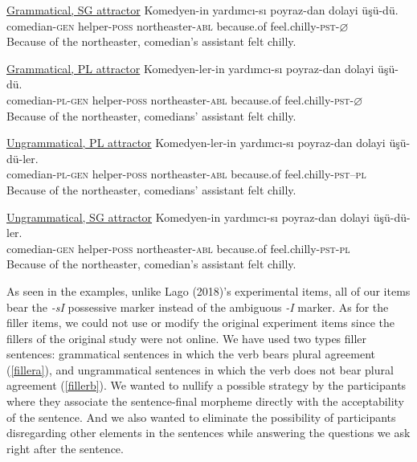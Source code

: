 \documentclass[11pt,a4paper]{article}
\begin{document}
\begin{exe}
\ex
\begin{xlist}
\ex \underline{Grammatical, SG attractor} \label{exp1}
\gll Komedyen-in yard{\i}mc{\i}-s{\i} poyraz-dan dolayi \"{u}\c{s}\"{u}-d\"{u}.\\
comedian-\textsc{gen} helper-\textsc{poss} northeaster-\textsc{abl} because.of feel.chilly-\textsc{pst}-$\varnothing$\\
\glt Because of the northeaster, comedian's assistant felt chilly.

\ex \underline{Grammatical, PL attractor} \label{exp2}
\gll Komedyen-ler-in yard{\i}mc{\i}-s{\i} poyraz-dan dolayi \"{u}\c{s}\"{u}-d\"{u}.\\
comedian-\textsc{pl}-\textsc{gen} helper-\textsc{poss} northeaster-\textsc{abl} because.of feel.chilly-\textsc{pst}-$\varnothing$\\
\glt Because of the northeaster, comedians' assistant felt chilly.

\ex \underline{Ungrammatical, PL attractor} \label{exp3}
\gll Komedyen-ler-in yard{\i}mc{\i}-s{\i} poyraz-dan dolayi \"{u}\c{s}\"{u}-d\"{u}-ler.\\
comedian-\textsc{pl}-\textsc{gen} helper-\textsc{poss} northeaster-\textsc{abl} because.of feel.chilly-\textsc{pst}--\textsc{pl}\\
\glt Because of the northeaster, comedians' assistant felt chilly.

\ex \underline{Ungrammatical, SG attractor} \label{exp4}
\gll Komedyen-in yard{\i}mc{\i}-s{\i} poyraz-dan dolayi \"{u}\c{s}\"{u}-d\"{u}-ler.\\
comedian-\textsc{gen} helper-\textsc{poss} northeaster-\textsc{abl} because.of feel.chilly-\textsc{pst}-\textsc{pl}\\
\glt Because of the northeaster, comedian's assistant felt chilly.

\end{xlist}
\end{exe}

As seen in the examples, unlike Lago (2018)'s experimental items, all of
our items bear the \emph{-sI} possessive marker instead of the ambiguous
\emph{-I} marker. As for the filler items, we could not use or modify
the original experiment items since the fillers of the original study
were not online. We have used two types filler sentences: grammatical
sentences in which the verb bears plural agreement (\ref{fillera}), and
ungrammatical sentences in which the verb does not bear plural agreement
(\ref{fillerb}). We wanted to nullify a possible strategy by the
participants where they associate the sentence-final morpheme directly
with the acceptability of the sentence. And we also wanted to eliminate
the possibility of participants disregarding other elements in the
sentences while answering the questions we ask right after the sentence.
\end{document}
